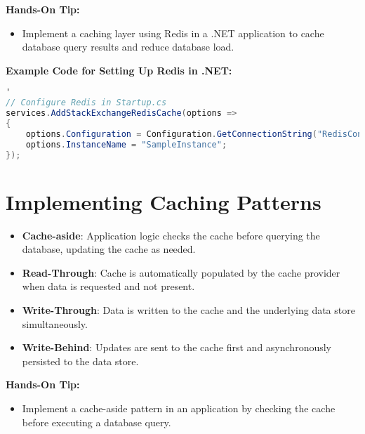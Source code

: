 \documentclass{article}
\begin{document}
\textbf{Hands-On Tip:}
\begin{itemize}
    \item Implement a caching layer using Redis in a .NET application to cache database query results and reduce database load.
\end{itemize}

\textbf{Example Code for Setting Up Redis in .NET:}
\begin{lstlisting}[language=csharp]'
// Configure Redis in Startup.cs
services.AddStackExchangeRedisCache(options =>
{
    options.Configuration = Configuration.GetConnectionString("RedisConnection");
    options.InstanceName = "SampleInstance";
});
\end{lstlisting}

\section{Implementing Caching Patterns}
\begin{itemize}
    \item \textbf{Cache-aside}: Application logic checks the cache before querying the database, updating the cache as needed.
    \item \textbf{Read-Through}: Cache is automatically populated by the cache provider when data is requested and not present.
    \item \textbf{Write-Through}: Data is written to the cache and the underlying data store simultaneously.
    \item \textbf{Write-Behind}: Updates are sent to the cache first and asynchronously persisted to the data store.
\end{itemize}

\textbf{Hands-On Tip:}
\begin{itemize}
    \item Implement a cache-aside pattern in an application by checking the cache before executing a database query.
\end{itemize}
\end{document}
